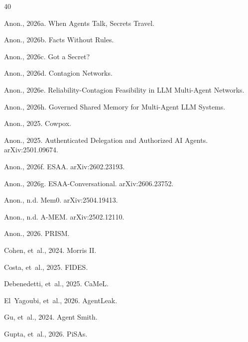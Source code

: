 \documentclass[preprint,12pt,authoryear]{elsarticle}
\begin{document}
\begin{thebibliography}{40}
\providecommand{\natexlab}[1]{#1}
\providecommand{\url}[1]{\texttt{#1}}

Anon., 2026a. When Agents Talk, Secrets Travel.

Anon., 2026b. Facts Without Rules.

Anon., 2026c. Got a Secret?

Anon., 2026d. Contagion Networks.

Anon., 2026e. Reliability-Contagion Feasibility in LLM Multi-Agent Networks.

Anon., 2026h. Governed Shared Memory for Multi-Agent LLM Systems.

Anon., 2025. Cowpox.

Anon., 2025. Authenticated Delegation and Authorized AI Agents. arXiv:2501.09674.

Anon., 2026f. ESAA. arXiv:2602.23193.

Anon., 2026g. ESAA-Conversational. arXiv:2606.23752.

Anon., n.d. Mem0. arXiv:2504.19413.

Anon., n.d. A-MEM. arXiv:2502.12110.

Anon., 2026. PRISM.

Cohen, et~al., 2024. Morris II.

Costa, et~al., 2025. FIDES.

Debenedetti, et~al., 2025. CaMeL.

El~Yagoubi, et~al., 2026. AgentLeak.

Gu, et~al., 2024. Agent Smith.

Gupta, et~al., 2026. PiSAs.


\end{thebibliography}
\end{document}
